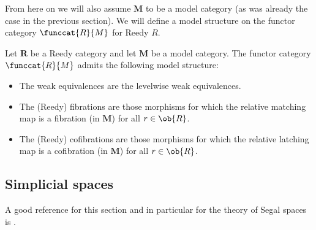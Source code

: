     From here on we will also assume $\mathbf{M}$ to be a model category (as was already the case in the previous section). We will define a model structure on the functor category $\funccat{R}{M}$ for Reedy $R$.

    \begin{property}
        Let $\mathbf{R}$ be a Reedy category and let $\mathbf{M}$ be a model category. The functor category $\funccat{R}{M}$ admits the following model structure:
        \begin{itemize}
            \item The weak equivalences are the levelwise weak equivalences.
            \item The (Reedy) fibrations are those morphisms for which the relative matching map is a fibration (in $\mathbf{M}$) for all $r\in\ob{R}$.
            \item The (Reedy) cofibrations are those morphisms for which the relative latching map is a cofibration (in $\mathbf{M}$) for all $r\in\ob{R}$.
        \end{itemize}
    \end{property}

\subsection{Simplicial spaces}

    A good reference for this section and in particular for the theory of Segal spaces is \cite{rezk}.


